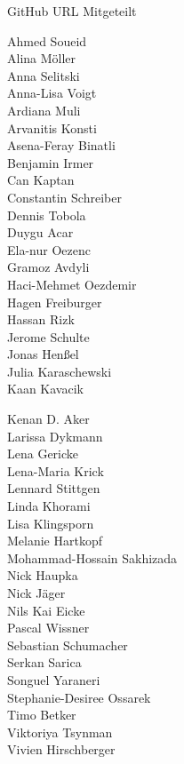 \documentclass{beamer}
\begin{document}
\begin{frame}{GitHub URL Mitgeteilt}
	
	\scriptsize
	\fboxsep=0pt
	\noindent%
		\begin{minipage}[t]{0.48\linewidth}
		Ahmed Soueid \\
		Alina Möller \\
		Anna Selitski \\
		Anna-Lisa Voigt \\
		Ardiana Muli \\
		Arvanitis Konsti \\
		Asena-Feray Binatli \\
		Benjamin Irmer \\
		Can Kaptan \\
		Constantin Schreiber \\
		Dennis Tobola \\
		Duygu Acar \\
		Ela-nur Oezenc \\
		Gramoz Avdyli \\
		Haci-Mehmet Oezdemir \\
		Hagen Freiburger \\
		Hassan Rizk  \\
		Jerome Schulte \\
		Jonas Henßel \\
		Julia Karaschewski \\
		Kaan Kavacik
		\end{minipage}%
	\hfill%
		\begin{minipage}[t]{0.48\linewidth}
		Kenan D. Aker \\
		Larissa Dykmann \\
		Lena Gericke \\
		Lena-Maria Krick \\
		Lennard Stittgen \\
		Linda Khorami \\
		Lisa Klingsporn \\
		Melanie Hartkopf \\
		Mohammad-Hossain Sakhizada \\
		Nick Haupka \\
		Nick Jäger \\
		Nils Kai Eicke \\
		Pascal Wissner \\
		Sebastian Schumacher \\
		Serkan Sarica \\
		Songuel Yaraneri \\
		Stephanie-Desiree Ossarek \\
		Timo Betker \\
		Viktoriya Tsynman \\
		Vivien Hirschberger
		\end{minipage}
	
\end{frame}
\end{document}
